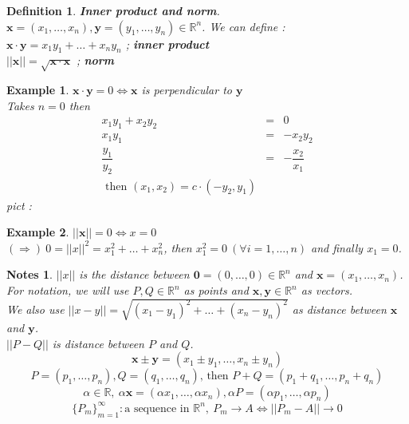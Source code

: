 \documentclass[a4paper,10pt]{article}
\newtheorem{defi}{Definition}
\newtheorem{ex}{Example}
\newtheorem{note}{Notes}
\begin{document}
\begin{defi}
	\textbf{Inner product and norm}.\\
	$ \mathbf{x} = (x_{1}, \dots, x_{n}) , \mathbf{y} = (y_{1}, \dots, y_{n}  ) \in \mathbb{R}^n $. We can define : \\
	$ \mathbf{x} \cdot \mathbf{y} = x_{1}y_{1} + \dots + x_{n}y_{n} $ ; \textbf{inner product}\\
	$ || \mathbf{x} ||= \sqrt{\mathbf{x} \cdot \mathbf{x}} $ ; \textbf{norm}
\end{defi}

\begin{ex}
	$ \mathbf{x} \cdot \mathbf{y} =0 \Leftrightarrow \mathbf{x} $ is perpendicular to $ \mathbf{y} $\\
	Takes $ n=0 $ then
	\begin{eqnarray} \nonumber
	x_{1}y_{1} + x_{2}y_{2} &=& 0 \\ \nonumber
	x_{1}y_{1} &=& -x_{2}y_{2} \\ \nonumber
	\dfrac{y_{1}}{y_{2}} &=& - \dfrac{x_{2}}{x_{1}}\\ \nonumber
	\text{ then } (x_{1},x_{2}) = c \cdot(-y_{2},y_{1})
	\end{eqnarray}
	pict : 
\end{ex}

\begin{ex}
	$ ||\mathbf{x}||=0 \Leftrightarrow x=0$\\
	$ (\Rightarrow) \ 0 = || x ||^2 = x_{1}^2 + \dots + x_{n}^2 $, then $ x_{1}^2 =0 \ (\forall i =1, \dots, n )$ and finally $ x_{1}=0 $.
\end{ex}

\begin{note}
	$ || x || $ is the distance between $ \mathbf{0} = (0, \dots, 0) \in \mathbb{R}^n $ and $ \mathbf{x}= (x_{1}, \dots, x_{n}) $.\\
	For notation, we will use $ P,Q \in \mathbb{R}^n $ as points and  $ \mathbf{x}, \mathbf{y} \in \mathbb{R}^n $ as vectors. \\
	We also use $ || x-y || = \sqrt{(x_{1}-y_{1})^2 + \dots + (x_{n}-y_{n})^2} $ as distance between $ \mathbf{x} $ and $ \mathbf{y} $. \\
	$ || P-Q || $ is distance between $ P $ and $ Q $.
	\[ \mathbf{x} \pm \mathbf{y} = ( x_{1} \pm y_{1} , \dots, x_{n} \pm y_{n} ) \]
	\[ P=(p_{1}, \dots, p_{n}) ,  Q = (q_{1}, \dots, q_{n})  \text{, then } P+Q = (p_{1}+q_{1}, \dots, p_{n}+q_{n}) \]
	\[ \alpha \in \mathbb{R}, \ \alpha\mathbf{x} = (\alpha x_{1}, \dots, \alpha x_{n}),  \alpha P = (\alpha p_{1}, \dots, \alpha p_{n})\]
	\[  \{P_{m}\}_{m=1}^{\infty} : \text{a sequence in } \mathbb{R}^n , \ P_{m} \rightarrow A \Leftrightarrow || P_{m}-A || \rightarrow 0 \]
\end{note}
\end{document}
